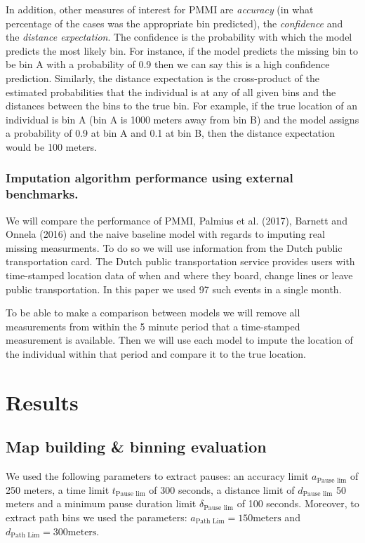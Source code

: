 \documentclass[man]{apa6}
\theoremstyle{definition}
\theoremstyle{definition}
\theoremstyle{definition}
\theoremstyle{remark}
\begin{document}
In addition, other measures of interest for PMMI are \emph{accuracy} (in
what percentage of the cases was the appropriate bin predicted), the
\emph{confidence} and the \emph{distance expectation}. The confidence is
the probability with which the model predicts the most likely bin. For
instance, if the model predicts the missing bin to be bin A with a
probability of 0.9 then we can say this is a high confidence prediction.
Similarly, the distance expectation is the cross-product of the
estimated probabilities that the individual is at any of all given bins
and the distances between the bins to the true bin. For example, if the
true location of an individual is bin A (bin A is 1000 meters away from
bin B) and the model assigns a probability of 0.9 at bin A and 0.1 at
bin B, then the distance expectation would be 100 meters.

\subsubsection{Imputation algorithm performance using external
benchmarks.}\label{imputation-algorithm-performance-using-external-benchmarks.}

We will compare the performance of PMMI, Palmius et al. (2017), Barnett
and Onnela (2016) and the naive baseline model with regards to imputing
real missing measurments. To do so we will use information from the
Dutch public transportation card. The Dutch public transportation
service provides users with time-stamped location data of when and where
they board, change lines or leave public transportation. In this paper
we used 97 such events in a single month.

To be able to make a comparison between models we will remove all
measurements from within the 5 minute period that a time-stamped
measurement is available. Then we will use each model to impute the
location of the individual within that period and compare it to the true
location.

\section{Results}\label{results}

\subsection{Map building \& binning
evaluation}\label{map-building-binning-evaluation-1}

We used the following parameters to extract pauses: an accuracy limit
\(a_{\text{Pause lim}}\) of 250 meters, a time limit
\(t_{\text{Pause lim}}\) of 300 seconds, a distance limit of
\(d_{\text{Pause lim}}\) 50 meters and a minimum pause duration limit
\(\delta_{\text{Pause lim}}\) of 100 seconds. Moreover, to extract path
bins we used the parameters: \(a_{\text{Path Lim}} = 150 \text{meters}\)
and \(d_{\text{Path Lim}} =300 \text{meters}\).
\end{document}
